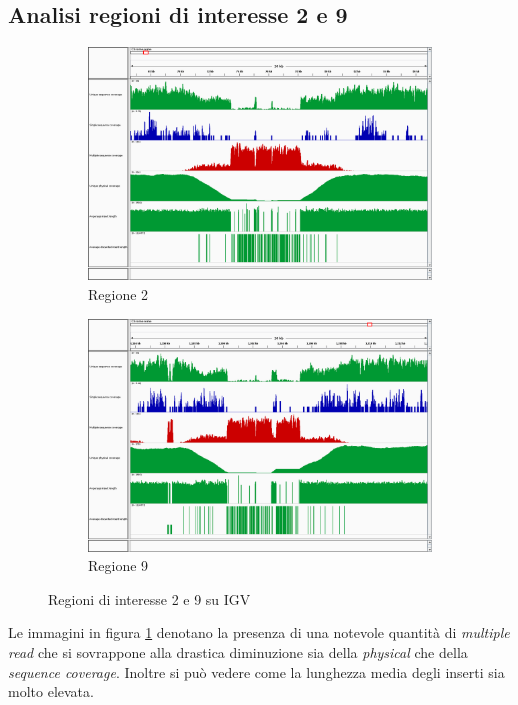 \subsection{Analisi regioni di interesse 2 e 9}
\begin{figure}[htbp]
	\centering
	\begin{subfigure}[b]{.45\textwidth}
		\includegraphics[width=\textwidth]{immagini/igv_regione2.png}
		\caption{Regione 2}
	\end{subfigure}
	\quad
	\begin{subfigure}[b]{.45\textwidth}
		\includegraphics[width=\textwidth]{immagini/igv_regione9.png}
		\caption{Regione 9}
	\end{subfigure}
\caption{Regioni di interesse 2 e 9 su IGV}
\label{fig:regioni 2 e 9}
\end{figure}

Le immagini in figura \ref{fig:regioni 2 e 9} denotano la presenza di una notevole quantità di \emph{multiple read} che si sovrappone alla drastica diminuzione sia della \emph{physical} che della \emph{sequence coverage}.
Inoltre si può vedere come la lunghezza media degli inserti sia molto elevata.

